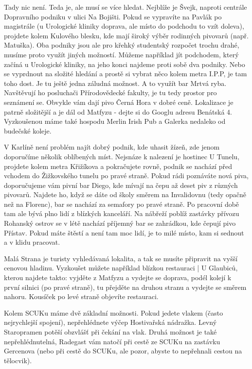 Tady nic není. Teda je, ale musí se více hledat. Nejblíže je Švejk, naproti centrále Dopravního podniku v ulici Na Bojišti. Pokud se vypravíte na Pavlák po magistrále (u Urologické kliniky doprava, ale místo do podchodu to vzít doleva), projdete kolem Kulového blesku, kde mají široký výběr rodinných pivovarů (např. Matuška). Oba podniky jsou ale pro křehký studentský rozpočet trochu drahé, musíme proto využít jiných možností. Můžeme například jít podchodem, který začíná u Urologické kliniky, na jeho konci najdeme proti sobě dva podniky. Nebo se vyprdnout na složité hledání a prostě si vybrat něco kolem metra I.P.P, je tam toho dost. Je tu ještě jedna záludná možnost. A to využít bar Mrtvá ryba. Navštěvují ho posluchači Přírodovědecké fakulty, je tu tedy prostor pro seznámení se. Obvykle vám dají pivo Černá Hora v dobré ceně. Lokalizace je patrně složitější a je dál od Matfyzu - dejte si do Googlu adresu Benátská 4. Vyzkoušenou máme také hospodu Merlin Irish Pub a Galerka nedaleko od budečské koleje.

V Karlíně není problém najít dobrý podnik, kde uhasit žízeň, zde jenom doporučíme několik oblíbených míst. Nejsnáze k nalezení je hostinec U Tunelu, projdete kolem metra Křižíkova a pokračujete rovně, podnik se nachází před vchodem do Žižkovského tunelu po pravé straně. Pokud rádi poznáváte nová piva, doporučujeme vám pivní bar Diego, kde mívají na čepu až deset piv z různých pivovarů. Najdete ho, když se dáte od školy směrem na Invalidovnu (tedy opačně než na Florenc), bar se nachází za semafory po pravé straně. Po pracovní době tam ale bývá plno lidí z blízkých kanceláří. Na nábřeží poblíž zastávky přívozu Rohanský ostrov se v létě nachází příjemný bar se zahrádkou, kde čepují pivo Přístav. Pokud máte štěstí a není tam moc lidí, je to milé místo, kam si sednout a v klidu pracovat.

Malá Strana je turisty vyhledávaná lokalita, a tak se musíte připravit na vyšší cenovou hladinu. Vyzkoušet můžete například blízkou restauraci | U Glaubiců, kterou najdete takto: vyjděte z Matfyzu a vydejte se doprava, podél kolejí k první silnici (po pravé straně), tu přejděte na druhou stranu a vydejte se směrem nahoru. Kousíček po levé straně objevíte restauraci.

Kolem SCUKu máme dvě základní možnosti. Pokud jedete vlakem (často nejrychlejší spojení), nepřehlédnete výčep Hostivařská nádražka. Levný Staropramen potěší obzvlášť při čekání na vlak. Druhá možnost je také nepřehlédnutelná, Radegast vám natočí při cestě ze SCUKu na zastávku Gercenova (nebo při cestě do SCUKu, ale pozor, abyste to nepřehnali cestou na tělocvik).


